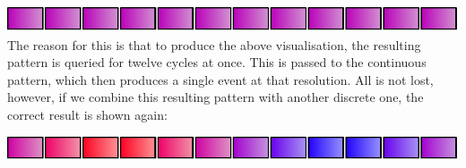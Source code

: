 \begin{Shaded}
\begin{Highlighting}[]
\OtherTok{=}
         \OtherTok{{-}\textgreater{}}
         \OtherTok{{-}\textgreater{}}
         \OtherTok{{-}\textgreater{}}  \OperatorTok{$}\OperatorTok{+}\NormalTok{)}\OperatorTok{/}
\end{Highlighting}
\end{Shaded}

\includegraphics{../figures/fig8.pdf}\\

The reason for this is that to produce the above visualisation, the
resulting pattern is queried for twelve cycles at once. This is passed
to the continuous pattern, which then produces a single event at that
resolution. All is not lost, however, if we combine this resulting
pattern with another discrete one, the correct result is shown again:

\begin{Shaded}
\begin{Highlighting}[]
\OtherTok{=}\NormalTok{) }\OperatorTok{$}
         \OtherTok{{-}\textgreater{}}
         \OtherTok{{-}\textgreater{}}
         \OtherTok{{-}\textgreater{}}  \OperatorTok{$}\OperatorTok{+}\NormalTok{)}\OperatorTok{/}
\end{Highlighting}
\end{Shaded}

\includegraphics{../figures/fig9.pdf}\\

